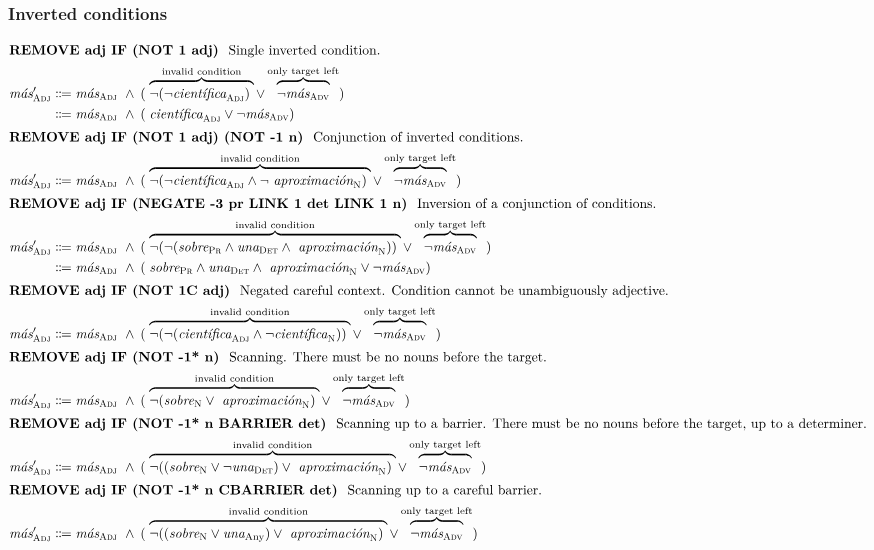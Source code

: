 \subsubsection{Inverted conditions}


\begin{align}
\intertext{\cgrule{REMOVE adj IF (NOT 1 adj)} Single inverted condition.}
  \newVar \mas{}'_\adj 
     & \eqdef \masAdj\ 
     \wedge\: ( \; \ob{\neg (\neg \cientificaAdj)\;}^{\invConds} 
     \vee \ob{\neg\masAdv}^{\onlyTrgLeft} ) \notag \\
     & \eqdef \masAdj\ 
     \wedge\: ( \; \cientificaAdj
     \vee  \neg\masAdv )  \\
%
\intertext{\cgrule{REMOVE adj IF (NOT 1 adj) (NOT -1 n)} Conjunction of inverted conditions.}
  \newVar \mas{}'_\adj 
     & \eqdef \masAdj\ 
     \wedge\: ( \; \ob{\neg (\neg \cientificaAdj \wedge \neg \aproximacionN)\;}^{\invConds} 
     \vee \ob{\neg\masAdv}^{\onlyTrgLeft} )  \\
%
%
\intertext{\cgrule{REMOVE adj IF (NEGATE -3 pr LINK 1 det LINK 1 n)} Inversion of a conjunction of conditions.}
%
  \newVar \mas{}'_\adj 
     & \eqdef \masAdj\ 
     \wedge\: ( \; \ob{\neg (\neg (\sobrePr \wedge \unaDet \wedge \aproximacionN))\;}^{\invConds} 
     \vee \ob{\neg\masAdv}^{\onlyTrgLeft} ) \notag \\
     & \eqdef \masAdj\ 
     \wedge\: ( \;  \sobrePr \wedge \unaDet \wedge \aproximacionN
     \vee \neg\masAdv )   \\
%
%
\intertext{\cgrule{REMOVE adj IF (NOT 1C adj)} Negated careful context. Condition cannot be unambiguously adjective.}
%
  \newVar \mas{}'_\adj 
     & \eqdef \masAdj\ 
     \wedge\: ( \; \ob{\neg (\neg (\cientificaAdj \wedge \neg\cientificaN ))\;}^{\invConds}
     \vee \ob{\neg\masAdv }^{\onlyTrgLeft} ) \\
%
%
\intertext{\cgrule{REMOVE adj IF (NOT -1* n)} Scanning. There must be no nouns before the target.}
%
  \newVar \mas{}'_\adj 
     & \eqdef \masAdj\ 
     \wedge\: ( \; \ob{\neg ( \sobreN \vee \aproximacionN )\;}^{\invConds}
     \vee \ob{\neg\masAdv }^{\onlyTrgLeft} ) \\
%
\intertext{\cgrule{REMOVE adj IF (NOT -1* n BARRIER det)} Scanning up to a barrier. There must be no nouns before the target, up to a determiner.}
%
  \newVar \mas{}'_\adj 
     & \eqdef \masAdj\ 
     \wedge\: ( \; \ob{\neg ( (\sobreN \vee \neg\unaDet) \vee \aproximacionN )\;}^{\invConds}
     \vee \ob{\neg\masAdv }^{\onlyTrgLeft} ) \\
%
%
\intertext{\cgrule{REMOVE adj IF (NOT -1* n CBARRIER det)} Scanning up to a careful barrier.}
%
  \newVar \mas{}'_\adj 
     & \eqdef \masAdj\ 
     \wedge\: ( \; \ob{\neg ( (\sobreN \vee \unaAny) \vee \aproximacionN )\;}^{\invConds}
     \vee \ob{\neg\masAdv }^{\onlyTrgLeft} ) 
%
%
%
\end{align}
